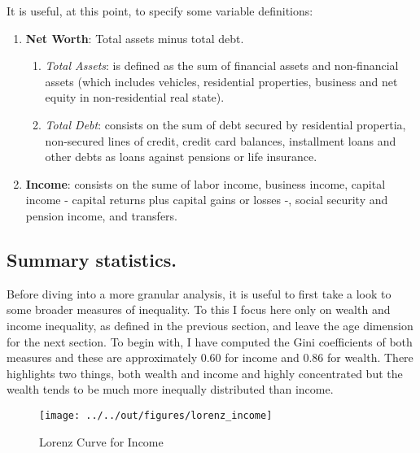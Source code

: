 \documentclass[11pt, a4paper, leqno]{article}
\begin{document}
It is useful, at this point, to specify some variable definitions:

\begin{enumerate}
    \item \textbf{Net Worth}: Total assets minus total debt.
    \begin{enumerate}
        \item \textit{Total Assets}: is defined as the sum of financial assets and non-financial assets (which includes vehicles, residential properties, business and net equity in non-residential real state).

        \item \textit{Total Debt}: consists on the sum of debt secured by residential propertia, non-secured lines of credit, credit card balances, installment loans and other debts as loans against pensions or life insurance.
    
    \end{enumerate}

    \item \textbf{Income}: consists on the sume of labor income, business income, capital income - capital returns plus capital gains or losses -, social security and pension income, and transfers.

\end{enumerate}

\subsection*{Summary statistics.}

Before diving into a more granular analysis, it is useful to first take a look to some broader measures of inequality. To this I focus here only on wealth and income inequality, as defined in the previous section, and leave the age dimension for the next section. To begin with, I have computed the Gini coefficients of both measures and these are approximately $0.60$ for income and $0.86$ for wealth. There highlights two things, both wealth and income and highly concentrated but the wealth tends to be much more inequally distributed than income.

\begin{figure}[H]
    \caption{Lorenz Curve for Income}
    
    \texttt{[image: ../../out/figures/lorenz\_income]}
    \label{fig:lorincome}
\end{figure}
\end{document}
